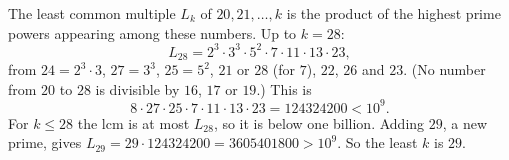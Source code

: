 The least common multiple $L_k$ of $20,21,\dots,k$ is the product of the highest prime powers appearing among these numbers. Up to $k=28$:
\[
L_{28}=2^3\cdot3^3\cdot5^2\cdot7\cdot11\cdot13\cdot23 ,
\]
from $24=2^3\cdot3$, $27=3^3$, $25=5^2$, $21$ or $28$ (for $7$), $22$, $26$ and $23$. (No number from $20$ to $28$ is divisible by $16$, $17$ or $19$.) This is
\[
8\cdot27\cdot25\cdot7\cdot11\cdot13\cdot23=124324200<10^9 .
\]
For $k\le28$ the lcm is at most $L_{28}$, so it is below one billion. Adding $29$, a new prime, gives $L_{29}=29\cdot124324200=3605401800>10^9$. So the least $k$ is $\boxed{29}$.
